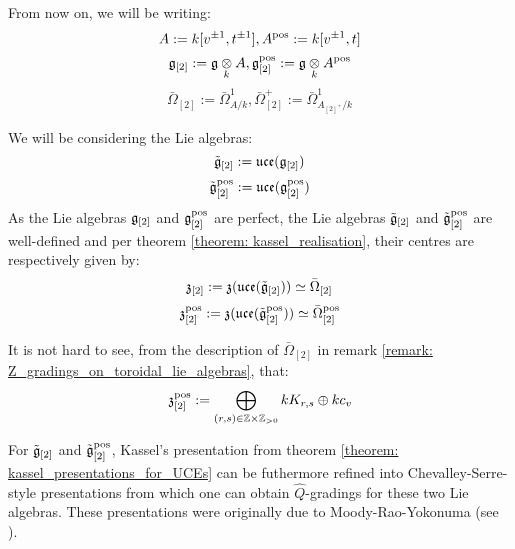         \begin{convention}
            From now on, we will be writing:
                $$A := k[v^{\pm 1}, t^{\pm 1}], A^{\mathrm{pos}} := k[v^{\pm 1}, t]$$
                $$\g_{[2]} := \g \tensor_k A, \g_{[2]}^{\positive} := \g \tensor_k A^{\positive}$$
                $$\bar{\Omega}_{[2]} := \bar{\Omega}^1_{A/k}, \bar{\Omega}^+_{[2]} := \bar{\Omega}^1_{A_{[2]^+}/k}$$

            We will be considering the Lie algebras:
                $$\tilde{\mathfrak{g}}_{[2]} := \mathfrak{uce}(\mathfrak{g}_{[2]})$$
                $$\tilde{\mathfrak{g}}_{[2]}^{\mathrm{pos}} := \mathfrak{uce}(\mathfrak{g}_{[2]}^{\mathrm{pos}})$$
            As the Lie algebras $\mathfrak{g}_{[2]}$ and $\mathfrak{g}_{[2]}^{\mathrm{pos}}$ are perfect, the Lie algebras $\tilde{\mathfrak{g}}_{[2]}$ and $\tilde{\mathfrak{g}}_{[2]}^{\mathrm{pos}}$ are well-defined and per theorem \ref{theorem: kassel_realisation}, their centres are respectively given by:
                $$\mathfrak{z}_{[2]} := \mathfrak{z}(\mathfrak{uce}(\tilde{\mathfrak{g}}_{[2]})) \simeq \bar{\Omega}_{[2]}$$
                $$\mathfrak{z}_{[2]}^{\mathrm{pos}} := \mathfrak{z}(\mathfrak{uce}(\tilde{\mathfrak{g}}_{[2]}^{\mathrm{pos}})) \simeq \bar{\Omega}_{[2]}^{\mathrm{pos}}$$
        \end{convention}
        \begin{remark}
            It is not hard to see, from the description of $\bar{\Omega}_{[2]}$ in remark \ref{remark: Z_gradings_on_toroidal_lie_algebras}, that:
                $$\z_{[2]}^{\positive} := \bigoplus_{(r, s) \in \Z \x \Z_{> 0}} k K_{r, s} \oplus k c_v$$
        \end{remark}
        For $\tilde{\mathfrak{g}}_{[2]}$ and $\tilde{\mathfrak{g}}_{[2]}^{\mathrm{pos}}$, Kassel's presentation from theorem \ref{theorem: kassel_presentations_for_UCEs} can be futhermore refined into Chevalley-Serre-style presentations from which one can obtain $\hat{Q}$-gradings for these two Lie algebras. These presentations were originally due to Moody-Rao-Yokonuma (see \cite{moody_rao_yokonuma_vertex_representations_of_toroidal_lie_algebras}). 

